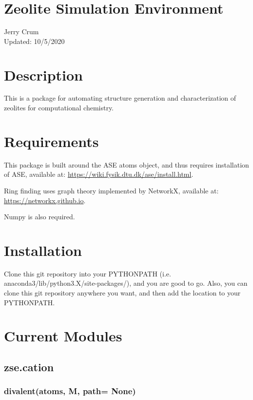 \documentclass[11pt]{article}
\author{Jerry Crum}
\date{\today}
\title{}
\begin{document}
\tableofcontents

\section{Zeolite Simulation Environment}
\label{sec:org87917e5}
Jerry Crum \\
Updated: 10/5/2020

\section{Description}
\label{sec:org0743d7d}
This is a package for automating structure generation and characterization of zeolites for computational chemistry.

\section{Requirements}
\label{sec:orgb2f779f}
This package is built around the ASE atoms object, and thus requires installation of ASE, available at: \url{https://wiki.fysik.dtu.dk/ase/install.html}.

Ring finding uses graph theory implemented by NetworkX, available at: \url{https://networkx.github.io}.

Numpy is also required.

\section{Installation}
\label{sec:org8a5f551}

Clone this git repository into your PYTHONPATH (i.e. anaconda3/lib/python3.X/site-packages/), and you are good to go. Also, you can clone this git repository anywhere you want, and then add the location to your PYTHONPATH.

\section{Current Modules}
\label{sec:org29f804a}

\subsection{zse.cation}
\label{sec:orgf0414b0}

\subsubsection{divalent(atoms, M, path= None)}
\label{sec:orgee4c8f5}
\end{document}
